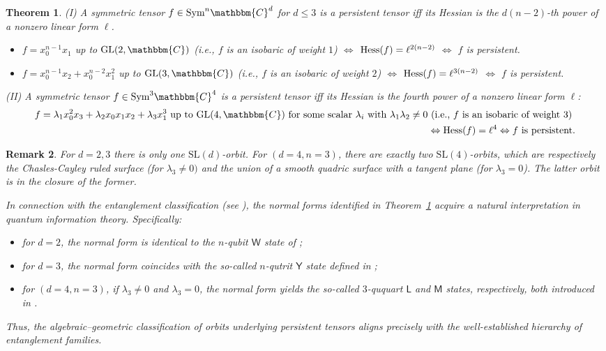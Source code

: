 \documentclass[aps,floatfix,groupedaddress,superscriptaddress,longbibliography,footinbib,notitlepage,showpacs]{revtex4-1}
\def\Hess{{\rm Hess}}
\newtheorem{theorem}{Theorem}
\newtheorem{remark}[theorem]{Remark}
\begin{document}
\begin{theorem}\label{thm:small_dim}
\textnormal{(I)} A symmetric tensor $f\in\text{Sym}^n\mathbbm{C}^d$ for $d\leq 3$ is a persistent tensor iff its Hessian is the $d(n-2)$-th power of a nonzero linear form $\ell$.
\begin{itemize}[leftmargin=1.6cm]
\item[($d=2$).] $f=x_0^{n-1}x_1$ up to $\mathrm{GL}(2,\mathbbm{C})$ (i.e., $f$ is an isobaric of weight $1$) $\Leftrightarrow$ $\Hess(f)=\ell^{2(n-2)}$ $\Leftrightarrow$ $f$ is persistent.

\item[($d=3$).] $f=x_0^{n-1}x_2+x_0^{n-2}x_1^2$ up to $\mathrm{GL}(3,\mathbbm{C})$ (i.e., $f$ is an isobaric of weight $2$)  $\Leftrightarrow$ $\Hess(f)=\ell^{3(n-2)}$ $\Leftrightarrow$ $f$ is persistent.
\end{itemize}

\textnormal{(II)} A symmetric tensor $f\in\text{Sym}^3\mathbbm{C}^4$ is a persistent tensor iff its Hessian is the fourth power of a nonzero linear form $\ell$:
\begin{align*}
f=\lambda_1x_0^{2}x_3+\lambda_2x_0x_1x_2+\lambda_3x_1^3 \text{~up~to~}\mathrm{GL}(4,\mathbbm{C})\text{~for~some~scalar~}\lambda_i~\text{with~}\lambda_1\lambda_2\neq 0\text{~(i.e.,~}f~\text{is~an~isobaric~of~weight~3)~}\\
\Leftrightarrow \Hess(f)=\ell^4 \Leftrightarrow f~\text{is~persistent}.
\end{align*}
\end{theorem}

\begin{remark}
For $d=2, 3$ there is only one $\mathrm{SL}(d)$-orbit. For $(d=4, n=3)$, there are exactly two $\mathrm{SL}(4)$-orbits, which are respectively the Chasles-Cayley ruled surface (for $\lambda_3\neq 0)$ and the union of a smooth quadric surface with a tangent plane (for $\lambda_3=0$). The latter orbit  is in the closure of the former.

In connection with the entanglement classification (see \cite{GMO}), the normal forms identified in Theorem~\ref{thm:small_dim} acquire a natural interpretation in quantum information theory. Specifically:
\begin{itemize}
\item for $d=2$, the normal form is identical to the $n$-qubit $\mathsf{W}$ state of \cite{DVC};
\item for $d=3$, the normal form coincides with the so-called $n$-qutrit $\mathsf{Y}$ state defined in \cite{GM};
\item for $(d=4, n=3)$, if $\lambda_{3}\neq 0$ and $\lambda_{3}=0$, the normal form yields the so-called $3$-ququart $\mathsf{L}$ and $\mathsf{M}$ states, respectively, both introduced in \cite{GL24}.
\end{itemize}
Thus, the algebraic–geometric classification of orbits underlying persistent tensors aligns precisely with the well-established hierarchy of entanglement families.
\end{remark}
\end{document}
